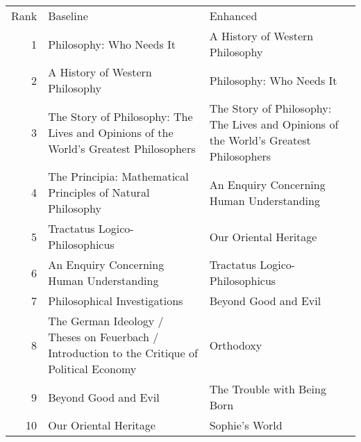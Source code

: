 \begin{tabular}{rll}
Rank & Baseline & Enhanced \\
1 & Philosophy: Who Needs It & A History of Western Philosophy \\
2 & A History of Western Philosophy & Philosophy: Who Needs It \\
3 & The Story of Philosophy: The Lives and Opinions of the World's Greatest Philosophers & The Story of Philosophy: The Lives and Opinions of the World's Greatest Philosophers \\
4 & The Principia: Mathematical Principles of Natural Philosophy & An Enquiry Concerning Human Understanding \\
5 & Tractatus Logico-Philosophicus & Our Oriental Heritage \\
6 & An Enquiry Concerning Human Understanding & Tractatus Logico-Philosophicus \\
7 & Philosophical Investigations & Beyond Good and Evil \\
8 & The German Ideology / Theses on Feuerbach / Introduction to the Critique of Political Economy & Orthodoxy \\
9 & Beyond Good and Evil & The Trouble with Being Born \\
10 & Our Oriental Heritage & Sophie's World \\
\end{tabular}
